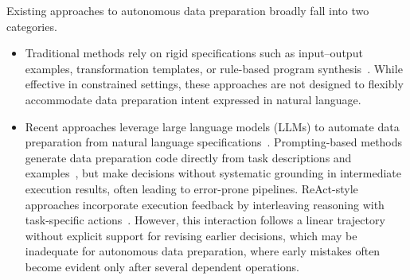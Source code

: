 Existing approaches to autonomous data preparation broadly fall into two categories.
%
\begin{itemize}[leftmargin=*]
    \item Traditional methods rely on rigid specifications such as input–output examples, transformation templates, or rule-based program synthesis~\cite{barowy2015flashrelate, singh2016blinkfill, he2018transform, jin2017foofah, huang2018auto}. While effective in constrained settings, these approaches are not designed to flexibly accommodate data preparation intent expressed in natural language.




\item Recent approaches leverage large language models (LLMs) to automate data preparation from natural language specifications~\cite{dong2024large,ruan2024language,lu2025large, zhang2026coda, deng2026taco}. Prompting-based methods generate data preparation code directly from task descriptions and examples~\cite{li2024towards, sapkota2025vibe, li2025weak}, but make decisions without systematic grounding in intermediate execution results, often leading to error-prone pipelines.
ReAct-style approaches incorporate execution feedback by interleaving reasoning with task-specific actions~\cite{yao2023react, aksitov2023rest}. However, this interaction follows a linear trajectory without explicit support for revising earlier decisions, which may be inadequate for autonomous data preparation, where early mistakes often become evident only after several dependent operations.
\end{itemize}

